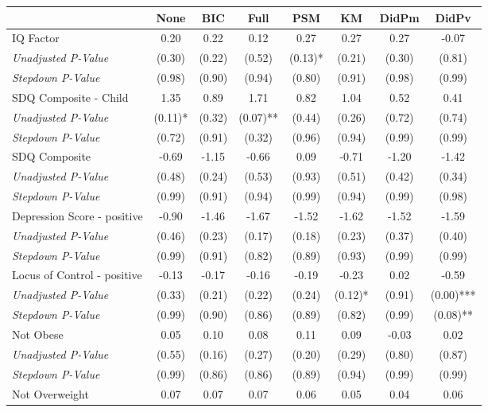 \begin{tabular}{l c c c c c c c}
\toprule
 & None & BIC & Full & PSM & KM & DidPm & DidPv \\
\midrule
IQ Factor & 0.20 & 0.22 & 0.12 & 0.27 & 0.27 & 0.27 & -0.07 \\
\quad \textit{Unadjusted P-Value} & (0.30) & (0.22) & (0.52) & (0.13)* & (0.21) & (0.30) & (0.81) \\
\quad \textit{Stepdown P-Value} & (0.98) & (0.90) & (0.94) & (0.80) & (0.91) & (0.98) & (0.99) \\
SDQ Composite - Child & 1.35 & 0.89 & 1.71 & 0.82 & 1.04 & 0.52 & 0.41 \\
\quad \textit{Unadjusted P-Value} & (0.11)* & (0.32) & (0.07)** & (0.44) & (0.26) & (0.72) & (0.74) \\
\quad \textit{Stepdown P-Value} & (0.72) & (0.91) & (0.32) & (0.96) & (0.94) & (0.99) & (0.99) \\
SDQ Composite & -0.69 & -1.15 & -0.66 & 0.09 & -0.71 & -1.20 & -1.42 \\
\quad \textit{Unadjusted P-Value} & (0.48) & (0.24) & (0.53) & (0.93) & (0.51) & (0.42) & (0.34) \\
\quad \textit{Stepdown P-Value} & (0.99) & (0.91) & (0.94) & (0.99) & (0.94) & (0.99) & (0.98) \\
Depression Score - positive & -0.90 & -1.46 & -1.67 & -1.52 & -1.62 & -1.52 & -1.59 \\
\quad \textit{Unadjusted P-Value} & (0.46) & (0.23) & (0.17) & (0.18) & (0.23) & (0.37) & (0.40) \\
\quad \textit{Stepdown P-Value} & (0.99) & (0.91) & (0.82) & (0.89) & (0.93) & (0.99) & (0.99) \\
Locus of Control - positive & -0.13 & -0.17 & -0.16 & -0.19 & -0.23 & 0.02 & -0.59 \\
\quad \textit{Unadjusted P-Value} & (0.33) & (0.21) & (0.22) & (0.24) & (0.12)* & (0.91) & (0.00)*** \\
\quad \textit{Stepdown P-Value} & (0.99) & (0.90) & (0.86) & (0.89) & (0.82) & (0.99) & (0.08)** \\
Not Obese & 0.05 & 0.10 & 0.08 & 0.11 & 0.09 & -0.03 & 0.02 \\
\quad \textit{Unadjusted P-Value} & (0.55) & (0.16) & (0.27) & (0.20) & (0.29) & (0.80) & (0.87) \\
\quad \textit{Stepdown P-Value} & (0.99) & (0.86) & (0.86) & (0.89) & (0.94) & (0.99) & (0.99) \\
Not Overweight & 0.07 & 0.07 & 0.07 & 0.06 & 0.05 & 0.04 & 0.06 \\

\end{tabular}
